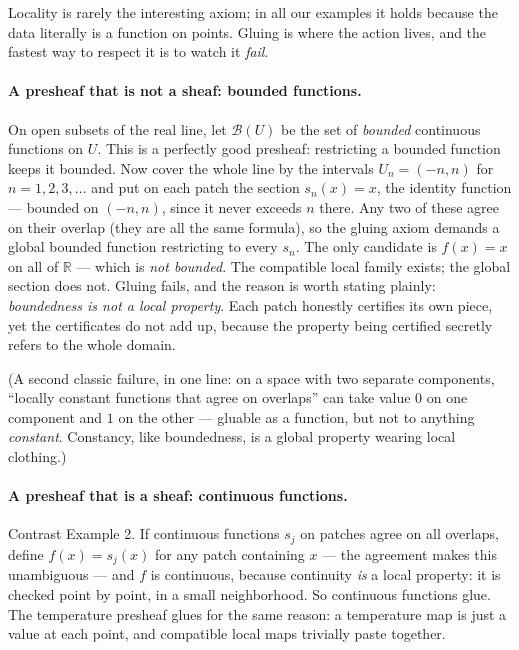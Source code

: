 \documentclass[11pt]{article}
\begin{document}
Locality is rarely the interesting axiom; in all our examples it holds
because the data literally is a function on points.  Gluing is where
the action lives, and the fastest way to respect it is to watch it
\emph{fail}.

\paragraph{A presheaf that is not a sheaf: bounded functions.}
On open subsets of the real line, let $\mathcal{B}(U)$ be the set of
\emph{bounded} continuous functions on $U$.  This is a perfectly good
presheaf: restricting a bounded function keeps it bounded.  Now cover
the whole line by the intervals $U_n = (-n, n)$ for
$n = 1, 2, 3, \dots$ and put on each patch the section
$s_n(x) = x$, the identity function --- bounded on $(-n,n)$, since it
never exceeds $n$ there.  Any two of these agree on their overlap (they
are all the same formula), so the gluing axiom demands a global bounded
function restricting to every $s_n$.  The only candidate is $f(x)=x$ on
all of $\mathbb{R}$ --- which is \emph{not bounded}.  The compatible
local family exists; the global section does not.  Gluing fails, and
the reason is worth stating plainly: \emph{boundedness is not a local
property}.  Each patch honestly certifies its own piece, yet the
certificates do not add up, because the property being certified
secretly refers to the whole domain.

(A second classic failure, in one line: on a space with two separate
components, ``locally constant functions that agree on overlaps'' can
take value $0$ on one component and $1$ on the other --- gluable as a
function, but not to anything \emph{constant}.  Constancy, like
boundedness, is a global property wearing local clothing.)

\paragraph{A presheaf that is a sheaf: continuous functions.}
Contrast Example 2.  If continuous functions $s_j$ on patches agree on
all overlaps, define $f(x) = s_j(x)$ for any patch containing $x$ ---
the agreement makes this unambiguous --- and $f$ is continuous, because
continuity \emph{is} a local property: it is checked point by point, in
a small neighborhood.  So continuous functions glue.  The temperature
presheaf glues for the same reason: a temperature map is just a value
at each point, and compatible local maps trivially paste together.
\end{document}
